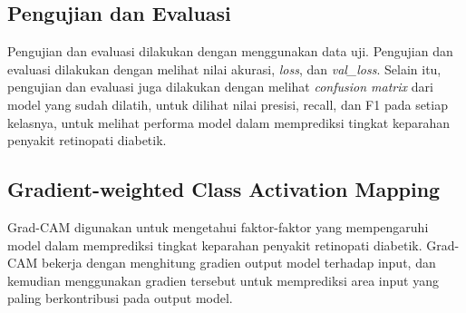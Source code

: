 \subsection{Pengujian dan Evaluasi}
\label{sec:326}
Pengujian dan evaluasi dilakukan dengan menggunakan data uji. Pengujian dan evaluasi dilakukan dengan melihat nilai akurasi, \emph{loss}, dan \emph{val\_loss}. Selain itu, pengujian dan evaluasi juga dilakukan dengan melihat \emph{confusion matrix} dari model yang sudah dilatih, untuk dilihat nilai presisi, recall, dan F1 pada setiap kelasnya, untuk melihat performa model dalam memprediksi tingkat keparahan penyakit retinopati diabetik.

\subsection{Gradient-weighted Class Activation Mapping}
\label{sec:327}
Grad-CAM digunakan untuk mengetahui faktor-faktor yang mempengaruhi model dalam memprediksi tingkat keparahan penyakit retinopati diabetik. Grad-CAM bekerja dengan menghitung gradien output model terhadap input, dan kemudian menggunakan gradien tersebut untuk memprediksi area input yang paling berkontribusi pada output model.